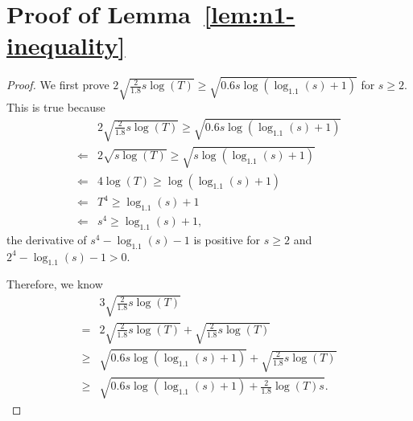 \section{Proof of Lemma~\ref{lem:n1-inequality}}
\label{sec:n1-inquality-proof}

\begin{proof}
We first prove $2\sqrt{\frac{2}{1.8}s\log(T)}\geq \sqrt{0.6s\log(\log_{1.1}(s)+1)}$ for $s\geq 2$. This is true because
\begin{align}
&2\sqrt{\frac{2}{1.8}s\log(T)}\geq \sqrt{0.6s\log(\log_{1.1}(s)+1)} \nonumber \\
\Longleftarrow & 2\sqrt{s\log(T)}\geq \sqrt{s\log(\log_{1.1}(s)+1)} \nonumber \\
\Longleftarrow & 4\log(T)\geq \log(\log_{1.1}(s)+1) \nonumber \\
\Longleftarrow & T^4 \geq \log_{1.1}(s)+1 \nonumber \\
\Longleftarrow & s^4 \geq \log_{1.1}(s)+1, \nonumber
\end{align}
the derivative of $s^4-\log_{1.1}(s)-1$ is positive for $s\geq 2$ and $2^4-\log_{1.1}(s)-1>0$. 

Therefore, we know
\begin{align}
&3\sqrt{\frac{2}{1.8}s\log(T)} \nonumber \\
= & 2\sqrt{\frac{2}{1.8}s\log(T)} + \sqrt{\frac{2}{1.8}s\log(T)} \nonumber \\
\geq & \sqrt{0.6s\log(\log_{1.1}(s)+1)}+\sqrt{\frac{2}{1.8}s\log(T)} \nonumber \\
\geq & \sqrt{0.6s\log(\log_{1.1}(s)+1)+\frac{2}{1.8}\log(T)s}. \nonumber 
\end{align}

\end{proof}
